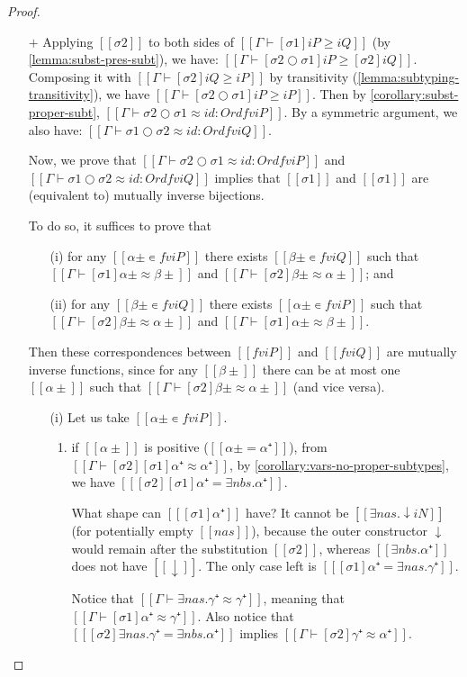 \begin{proof}
  \hfill
  \begin{itemize}
  \item[$+$]
    Applying $[[σ2]]$ to both sides of
    $[[Γ ⊢ [σ1] iP ≥ iQ]]$ (by \cref{lemma:subst-pres-subt}),
    we have: $[[Γ ⊢ [σ2 ○ σ1] iP ≥ [σ2]iQ]]$.
    Composing it with $[[Γ ⊢ [σ2] iQ ≥ iP]]$ by transitivity 
    (\cref{lemma:subtyping-transitivity}),
    we have $[[Γ ⊢ [σ2 ○ σ1] iP ≥ iP]]$.
    Then by \cref{corollary:subst-proper-subt},
    $[[Γ ⊢ σ2 ○ σ1 ≈ id : Ord fv iP]]$.
    By a symmetric argument, we also have:
    $[[Γ ⊢ σ1 ○ σ2 ≈ id : Ord fv iQ]]$.

    Now, we prove that
    $[[Γ ⊢ σ2 ○ σ1 ≈ id : Ord fv iP]]$ and
    $[[Γ ⊢ σ1 ○ σ2 ≈ id : Ord fv iQ]]$
    implies that $[[σ1]]$ and $[[σ1]]$
    are (equivalent to) mutually inverse bijections.

    To do so, it suffices to prove that
    \begin{enumerate}
    \item[(i)] for any $[[α± ∊ fv iP]]$ there exists $[[β± ∊ fv iQ]]$
        such that $[[ Γ ⊢ [σ1] α± ≈ β± ]]$ and
        $[[ Γ ⊢ [σ2] β± ≈ α± ]]$; and
    \item[(ii)] for any $[[β± ∊ fv iQ]]$ there exists $[[α± ∊ fv iP]]$
        such that $[[ Γ ⊢ [σ2] β± ≈ α± ]]$ and
        $[[ Γ ⊢ [σ1] α± ≈ β± ]]$.
    \end{enumerate}
    Then these correspondences between $[[fv iP]]$ and
    $[[fv iQ]]$ are mutually inverse functions,
    since for any $[[β±]]$ there can be at most one $[[α±]]$
    such that $[[ Γ ⊢ [σ2] β± ≈ α± ]]$ (and vice versa).

    \begin{enumerate}
    \item[(i)] Let us take $[[α± ∊ fv iP]]$.
      \begin{enumerate}
      \item if $[[α±]]$ is positive ($[[α± = α⁺]]$),
        from $[[ Γ ⊢ [σ2][σ1]α⁺ ≈ α⁺ ]]$,
        by \cref{corollary:vars-no-proper-subtypes},
        we have
        $[[ [σ2][σ1]α⁺ = ∃nbs.α⁺ ]]$.

        What shape can $[[ [σ1]α⁺ ]]$ have? It cannot be $[[∃nas.↓iN]]$ (for
        potentially empty $[[nas]]$), because the outer constructor $\downarrow$
        would remain after the substitution $[[σ2]]$, whereas $[[∃nbs.α⁺]]$ does
        not have $[[↓]]$. The only case left is $[[ [σ1]α⁺ = ∃nas.γ⁺ ]]$.

        Notice that $[[Γ ⊢ ∃nas.γ⁺ ≈ γ⁺]]$, meaning that $[[Γ ⊢ [σ1]α⁺ ≈ γ⁺]]$.
        Also notice that $[[ [σ2]∃nas.γ⁺ = ∃nbs.α⁺ ]]$ implies
        $[[Γ ⊢ [σ2]γ⁺ ≈ α⁺]]$.


\end{enumerate}
\end{enumerate}
\end{itemize}
\end{proof}
